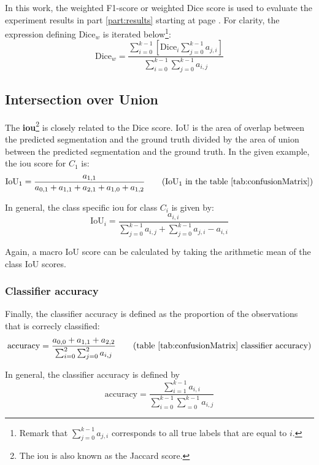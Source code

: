 In this work, the weighted F1-score or weighted Dice score is used to evaluate the experiment results in part \ref{part:results} starting at page \pageref{part:results}.
For clarity, the expression defining $\text{Dice}_w$ is iterated below\footnote{Remark that $\sum_{j=0}^{k-1} a_{j,i}$ corresponds to all true labels that are equal to $i$.}:
\begin{equation}
    \text{Dice}_w = \frac{\sum_{i=0}^{k-1} \left[ \text{Dice}_i \sum_{j=0}^{k-1} a_{j,i} \right] }{\sum_{i=0}^{k-1} \sum_{j=0}^{k-1} a_{i,j} } \label{eq:weighted_dice}
\end{equation}

\subsection{Intersection over Union}

The \textbf{\acrfull{iou}}\footnote{The \acrshort{iou} is also known as the Jaccard score.} is closely related to the Dice score.
IoU is the area of overlap between the predicted segmentation and the ground truth divided by the area of union between the predicted segmentation and the ground truth.
In the given example, the \acrshort{iou} score for $C_1$ is:
\begin{equation}
    \text{IoU}_1 = \frac{a_{1,1}}{a_{0,1}+a_{1,1}+a_{2,1}+a_{1,0}+a_{1,2}} \tag{IoU$_1$ in the table \ref{tab:confusionMatrix}}
\end{equation}

In general, the class specific \acrfull{iou} for class $C_i$ is given by:
\begin{equation}
    \text{IoU}_i = \frac{a_{i,i}}{\sum_{j=0}^{k-1} a_{i, j} + \sum_{j=0}^{k-1} a_{j,i} - a_{i,i}} 
\end{equation}

Again, a macro IoU score can be calculated by taking the arithmetic mean of the class IoU scores.

\subsubsection{Classifier accuracy}

Finally, the classifier accuracy is defined as the proportion of the observations that is correcly classified:
\begin{equation}
    \text{accuracy} = \frac{a_{0,0} + a_{1,1} + a_{2,2}}{\sum_{i=0}^{2} \sum_{j=0}^{2} a_{i,j}   } \tag{table \ref{tab:confusionMatrix} classifier accuracy}
\end{equation}

In general, the classifier accuracy is defined by 
\begin{equation}
    \text{accuracy} = \frac{\sum_{i=1}^{k-1}a_{i,i}}{\sum_{i=0}^{k-1} \sum_{=0}^{k-1} a_{i,j}   } 
\end{equation}


